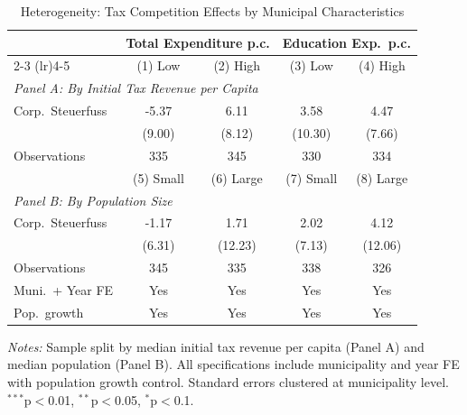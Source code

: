 \begin{table}[htbp]
\centering
\caption{Heterogeneity: Tax Competition Effects by Municipal Characteristics}
\label{tab:heterogeneity}
\begin{tabular}{lcccc}
\hline\hline
& \multicolumn{2}{c}{Total Expenditure p.c.} & \multicolumn{2}{c}{Education Exp.\ p.c.} \\
\cmidrule(lr){2-3} \cmidrule(lr){4-5}
& (1) Low & (2) High & (3) Low & (4) High \\
\hline
\multicolumn{5}{l}{\textit{Panel A: By Initial Tax Revenue per Capita}} \\
Corp.\ Steuerfuss & -5.37 & 6.11 & 3.58 & 4.47 \\
& (9.00) & (8.12) & (10.30) & (7.66) \\
Observations & 335 & 345 & 330 & 334 \\
\hline
& (5) Small & (6) Large & (7) Small & (8) Large \\
\hline
\multicolumn{5}{l}{\textit{Panel B: By Population Size}} \\
Corp.\ Steuerfuss & -1.17 & 1.71 & 2.02 & 4.12 \\
& (6.31) & (12.23) & (7.13) & (12.06) \\
Observations & 345 & 335 & 338 & 326 \\
\hline
Muni.\ + Year FE & Yes & Yes & Yes & Yes \\
Pop.\ growth & Yes & Yes & Yes & Yes \\
\hline\hline
\end{tabular}
\begin{tablenotes}\small
\item \textit{Notes:} Sample split by median initial tax revenue per capita (Panel A) and median population (Panel B). All specifications include municipality and year FE with population growth control. Standard errors clustered at municipality level. $^{***}$p$<$0.01, $^{**}$p$<$0.05, $^{*}$p$<$0.1.
\end{tablenotes}
\end{table}
